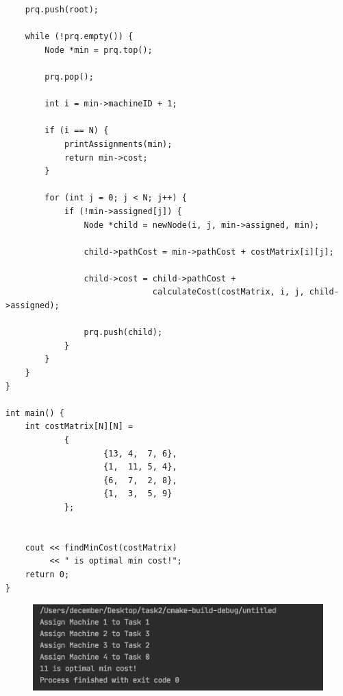 \documentclass{article}
\begin{document}
\begin{lstlisting}
    prq.push(root);

    while (!prq.empty()) {
        Node *min = prq.top();

        prq.pop();

        int i = min->machineID + 1;

        if (i == N) {
            printAssignments(min);
            return min->cost;
        }

        for (int j = 0; j < N; j++) {
            if (!min->assigned[j]) {
                Node *child = newNode(i, j, min->assigned, min);

                child->pathCost = min->pathCost + costMatrix[i][j];

                child->cost = child->pathCost +
                              calculateCost(costMatrix, i, j, child->assigned);

                prq.push(child);
            }
        }
    }
}

int main() {
    int costMatrix[N][N] =
            {
                    {13, 4,  7, 6},
                    {1,  11, 5, 4},
                    {6,  7,  2, 8},
                    {1,  3,  5, 9}
            };


    cout << findMinCost(costMatrix)
         << " is optimal min cost!";
    return 0;
}

\end{lstlisting}

\begin{figure}[H]
    \includegraphics[width=1\textwidth]{Fig2}
\end{figure}
\end{document}
